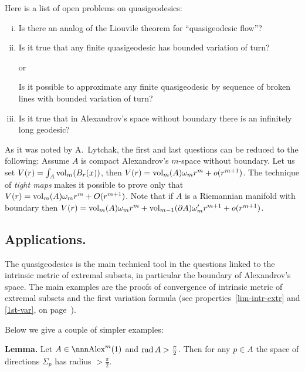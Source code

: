 \documentclass{article}
\begin{document}
\noi Here is a list of open problems on quasigeodesics:

\begin{enumerate}[(i)]
\item Is there an analog of the Liouvile theorem for ``quasigeodesic flow''?
\item Is it true that any finite quasigeodesic has bounded variation of turn?  

or

Is it possible to approximate any finite quasigeodesic by sequence of
broken lines with bounded variation of turn?

\item Is it true that in Alexandrov's space without boundary there is an
infinitely long geodesic?
\end{enumerate}

As it was noted by A.~Lytchak, the first and last questions can be reduced to the following:
Assume $A$ is compact Alexandrov's $m$-space without boundary. Let us set
$V(r)=\int_A\operatorname{vol}_m(B_r(x))$,
then $V(r)=\operatorname{vol}_m(A)\omega_m r^m+o(r^{m+1})$.
The technique of \emph{tight maps} makes it possible to prove only that
$V(r)\z=\vol_m(A)\omega_m r^m+O(r^{m+1})$.
Note that if $A$ is a Riemannian manifold with boundary then $V(r)=\operatorname{vol}_m(A)\omega_m r^m+\operatorname{vol}_{m-1}(\partial A)\omega'_m
r^{m+1}+o(r^{m+1})$.%









\subsection{Applications.}

The quasigeodesics is the main technical tool in the questions linked to the intrinsic
metric of extremal subsets, in particular the boundary of Alexandrov's space. 
The main examples are
the proofs of convergence of intrinsic metric of extremal subsets and
the first variation formula (see properties~\ref{lim-intr-extr} and \ref{1st-var}, on page~\pageref{lim-intr-extr}).
 
Below  we give a couple of simpler examples:

\begin{thm}{\bf Lemma.}\label{lemma:rad-big-U_p}
Let $A\in\Alex^m(1)$  and  $\operatorname{rad} A>\tfrac\pi2$. 
Then for any $p\in A$
the space of directions $\Sigma_p$ has radius $> \tfrac\pi2$.
\end{thm}
\end{document}
